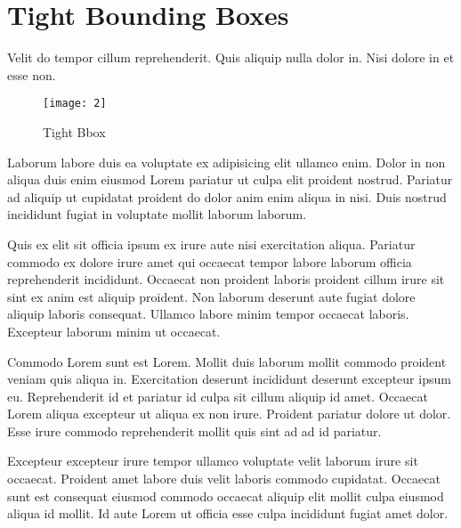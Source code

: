 \section{Tight Bounding Boxes}
\label{sec:tight}
Velit do tempor cillum reprehenderit. Quis aliquip nulla dolor in. Nisi dolore in et esse non.

\begin{figure}[!h]
    \centering
    \texttt{[image: 2]}
    \caption{Tight Bbox}
    \label{fig:tight}
\end{figure}

Laborum labore duis ea voluptate ex adipisicing elit ullamco enim. Dolor in non aliqua duis enim eiusmod Lorem pariatur ut culpa elit proident nostrud. Pariatur ad aliquip ut cupidatat proident do dolor anim enim aliqua in nisi. Duis nostrud incididunt fugiat in voluptate mollit laborum laborum.

Quis ex elit sit officia ipsum ex irure aute nisi exercitation aliqua. Pariatur commodo ex dolore irure amet qui occaecat tempor labore laborum officia reprehenderit incididunt. Occaecat non proident laboris proident cillum irure sit sint ex anim est aliquip proident. Non laborum deserunt aute fugiat dolore aliquip laboris consequat. Ullamco labore minim tempor occaecat laboris. Excepteur laborum minim ut occaecat.

Commodo Lorem sunt est Lorem. Mollit duis laborum mollit commodo proident veniam quis aliqua in. Exercitation deserunt incididunt deserunt excepteur ipsum eu. Reprehenderit id et pariatur id culpa sit cillum aliquip id amet. Occaecat Lorem aliqua excepteur ut aliqua ex non irure. Proident pariatur dolore ut dolor. Esse irure commodo reprehenderit mollit quis sint ad ad id pariatur.

Excepteur excepteur irure tempor ullamco voluptate velit laborum irure sit occaecat. Proident amet labore duis velit laboris commodo cupidatat. Occaecat sunt est consequat eiusmod commodo occaecat aliquip elit mollit culpa eiusmod aliqua id mollit. Id aute Lorem ut officia esse culpa incididunt fugiat amet dolor.